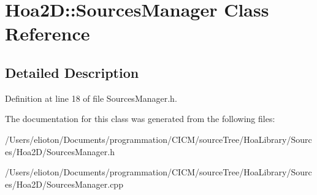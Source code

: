 \hypertarget{class_hoa2_d_1_1_sources_manager}{\section{Hoa2\-D\-:\-:Sources\-Manager Class Reference}
\label{class_hoa2_d_1_1_sources_manager}
}


\subsection{Detailed Description}


Definition at line 18 of file Sources\-Manager.\-h.



The documentation for this class was generated from the following files\-:\begin{DoxyCompactItemize}
\item 
/\-Users/elioton/\-Documents/programmation/\-C\-I\-C\-M/source\-Tree/\-Hoa\-Library/\-Sources/\-Hoa2\-D/Sources\-Manager.\-h\item 
/\-Users/elioton/\-Documents/programmation/\-C\-I\-C\-M/source\-Tree/\-Hoa\-Library/\-Sources/\-Hoa2\-D/Sources\-Manager.\-cpp\end{DoxyCompactItemize}
